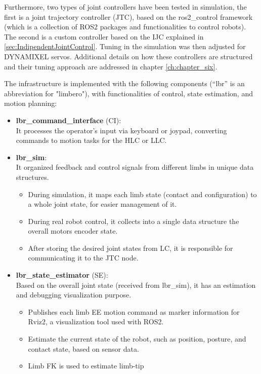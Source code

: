 Furthermore, two types of joint controllers have been tested in simulation, the first is a joint trajectory controller (JTC), based on the ros2\_control framework (which is a collection of ROS2 packages and functionalities to control robots). 
The second is a custom controller based on the IJC explained in \ref{sec:IndipendentJointControl}. Tuning in the simulation was then adjusted for DYNAMIXEL servos. 
Additional details on how these controllers are structured and their tuning approach are addressed in chapter \ref{ch:chapter_six}.

The infrastructure is implemented with the following components (“lbr” is an abbreviation for "limbero"), with functionalities of control, state estimation, and motion planning: 
\begin{itemize}
\item \textbf{lbr\_command\_interface} (CI):\\ 
    It processes the operator's input via keyboard or joypad, converting commands to motion tasks for the HLC or LLC.
\item \textbf{lbr\_sim}: \\
    It organized feedback and control signals from different limbs in unique data structures. 
    \begin{itemize}
    \setlength\itemsep{-0.7em} 
    \item[-] During simulation, it maps each limb state (contact and configuration) to a whole joint state, for easier management of it.
    \item[-] During real robot control, it collects into a single data structure the overall motors encoder state. \item[-] After storing the desired joint states from LC, it is responsible for communicating it to the JTC node.
    \end{itemize}
\item \textbf{lbr\_state\_estimator} (SE): \\
Based on the overall joint state (received from lbr\_sim), it has an estimation and debugging visualization purpose. 
    \begin{itemize}
        \setlength\itemsep{-0.7em} 
        \item[-] Publishes each limb EE motion command as marker information for Rviz2, a visualization tool used with ROS2.
        \item [-] Estimate the current state of the robot, such as position, posture, and contact state, based on sensor data.
        \item [-] Limb FK is used to estimate limb-tip 

\end{itemize}
\end{itemize}
